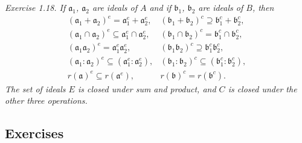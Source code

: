 \noindent\textit{Exercise 1.18. If $\mathfrak a_1$, $\mathfrak a_2$ are ideals of $A$ and if $\mathfrak b_1$, $\mathfrak b_2$ are ideals of $B$, then}
\[
\begin{array}{ll}
(\mathfrak a_1+\mathfrak a_2)^e=\mathfrak a_1^e+\mathfrak a_2^e,
& (\mathfrak b_1+\mathfrak b_2)^c\supseteq\mathfrak b_1^c+\mathfrak b_2^c,\\
(\mathfrak a_1\cap\mathfrak a_2)^e\subseteq\mathfrak a_1^e\cap\mathfrak a_2^e,
& (\mathfrak b_1\cap\mathfrak b_2)^c=\mathfrak b_1^c\cap\mathfrak b_2^c,\\
(\mathfrak a_1\mathfrak a_2)^e=\mathfrak a_1^e\mathfrak a_2^e,
& (\mathfrak b_1\mathfrak b_2)^c\supseteq\mathfrak b_1^c\mathfrak b_2^c,\\
(\mathfrak a_1:\mathfrak a_2)^e\subseteq(\mathfrak a_1^e:\mathfrak a_2^e),
& (\mathfrak b_1:\mathfrak b_2)^c\subseteq(\mathfrak b_1^c:\mathfrak b_2^c),\\
r(\mathfrak a)^e\subseteq r(\mathfrak a^e),
& r(\mathfrak b)^c=r(\mathfrak b^c).
\end{array}
\]
\textit{The set of ideals $E$ is closed under sum and product, and $C$ is closed under the other three operations.}

\subsection{Exercises}

